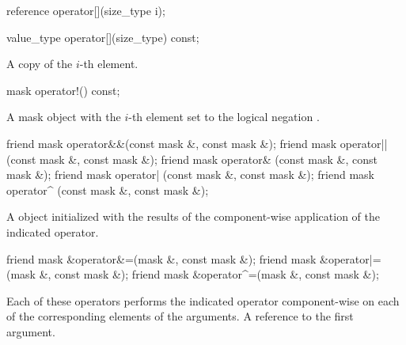 \begin{itemdecl}
reference operator[](size_type i);
\end{itemdecl}
\begin{itemdescr}
  \dataparElementReference
\end{itemdescr}

\begin{itemdecl}
value_type operator[](size_type) const;
\end{itemdecl}
\begin{itemdescr}
  \pnum\returns A copy of the $i$-th element.
\end{itemdescr}

\begin{itemdecl}
mask operator!() const;
\end{itemdecl}
\begin{itemdescr}
  \pnum\returns A mask object with the $i$-th element set to the logical negation \foralli.
\end{itemdescr}


\begin{itemdecl}
friend mask operator&&(const mask &, const mask &);
friend mask operator||(const mask &, const mask &);
friend mask operator& (const mask &, const mask &);
friend mask operator| (const mask &, const mask &);
friend mask operator^ (const mask &, const mask &);
\end{itemdecl}
\begin{itemdescr}
  \pnum\returns A \mask object initialized with the results of the component-wise application of the indicated operator.
\end{itemdescr}

\begin{itemdecl}
friend mask &operator&=(mask &, const mask &);
friend mask &operator|=(mask &, const mask &);
friend mask &operator^=(mask &, const mask &);
\end{itemdecl}
\begin{itemdescr}
  \pnum\effects Each of these operators performs the indicated operator component-wise on each of the corresponding elements of the arguments.
  \pnum\returns A reference to the first argument.
\end{itemdescr}

